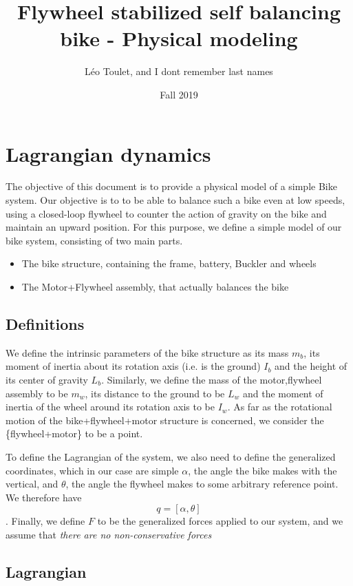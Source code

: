 \documentclass[11pt]{article}
\author{Léo Toulet, and I dont remember last names}
\date{Fall 2019}
\title{Flywheel stabilized self balancing bike - Physical modeling}
\begin{document}
\maketitle

\section{Lagrangian dynamics}

The objective of this document is to provide a physical model of a simple Bike system. Our objective is to to be able to balance such a bike even at low speeds, using a closed-loop flywheel to counter the action of gravity on the bike and maintain an upward position.
For this purpose, we define a simple model of our bike system, consisting of two main parts. 
\begin{itemize}
	\item The bike structure, containing the frame, battery, Buckler and wheels
	\item The Motor+Flywheel assembly, that actually balances the bike
\end{itemize}

\subsection{Definitions}

We define the intrinsic parameters of the bike structure as its mass $m_b$, its moment of inertia about its rotation axis (i.e. is the ground) $I_b$ and the height of its center of gravity $L_b$. Similarly, we define the mass of the motor,flywheel assembly to be $m_w$, its distance to the ground to be $L_w$ and the moment of inertia of the wheel around its rotation axis to be $I_w$. As far as the rotational motion of the bike+flywheel+motor structure is concerned, we consider the \{flywheel+motor\} to be a point. 

To define the Lagrangian of the system, we also need to define the generalized coordinates, which in our case are simple $\alpha$, the angle the bike makes with the vertical, and $\theta$, the angle the flywheel makes to some arbitrary reference point. We therefore have $$ q = [\alpha, \theta]$$. Finally, we define $F$ to be the generalized forces applied to our system, and we assume that \textit{there are no non-conservative forces}


\subsection{Lagrangian}
\end{document}
